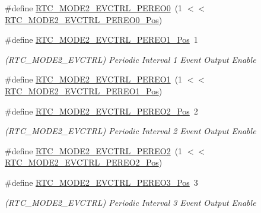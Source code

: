 \begin{DoxyCompactItemize}
\#define \mbox{\hyperlink{group___s_a_m_d21___r_t_c_ga372263f208d699c0012089888a02ea46}{R\+T\+C\+\_\+\+M\+O\+D\+E2\+\_\+\+E\+V\+C\+T\+R\+L\+\_\+\+P\+E\+R\+E\+O0}}~(1 $<$$<$ \mbox{\hyperlink{group___s_a_m_d21___r_t_c_gabcb181112a56aeecec631b74abedeb3d}{R\+T\+C\+\_\+\+M\+O\+D\+E2\+\_\+\+E\+V\+C\+T\+R\+L\+\_\+\+P\+E\+R\+E\+O0\+\_\+\+Pos}})
\item 
\#define \mbox{\hyperlink{group___s_a_m_d21___r_t_c_ga0e79167c14a87222de493856568bd6fe}{R\+T\+C\+\_\+\+M\+O\+D\+E2\+\_\+\+E\+V\+C\+T\+R\+L\+\_\+\+P\+E\+R\+E\+O1\+\_\+\+Pos}}~1
\begin{DoxyCompactList}\small\item\em (R\+T\+C\+\_\+\+M\+O\+D\+E2\+\_\+\+E\+V\+C\+T\+RL) Periodic Interval 1 Event Output Enable \end{DoxyCompactList}\item 
\#define \mbox{\hyperlink{group___s_a_m_d21___r_t_c_ga8afbad0c26e616db244521bc8642c640}{R\+T\+C\+\_\+\+M\+O\+D\+E2\+\_\+\+E\+V\+C\+T\+R\+L\+\_\+\+P\+E\+R\+E\+O1}}~(1 $<$$<$ \mbox{\hyperlink{group___s_a_m_d21___r_t_c_ga0e79167c14a87222de493856568bd6fe}{R\+T\+C\+\_\+\+M\+O\+D\+E2\+\_\+\+E\+V\+C\+T\+R\+L\+\_\+\+P\+E\+R\+E\+O1\+\_\+\+Pos}})
\item 
\#define \mbox{\hyperlink{group___s_a_m_d21___r_t_c_gae1804578e8194a9e5efe359be113f916}{R\+T\+C\+\_\+\+M\+O\+D\+E2\+\_\+\+E\+V\+C\+T\+R\+L\+\_\+\+P\+E\+R\+E\+O2\+\_\+\+Pos}}~2
\begin{DoxyCompactList}\small\item\em (R\+T\+C\+\_\+\+M\+O\+D\+E2\+\_\+\+E\+V\+C\+T\+RL) Periodic Interval 2 Event Output Enable \end{DoxyCompactList}\item 
\#define \mbox{\hyperlink{group___s_a_m_d21___r_t_c_gafd99da4acd052175dc7b01f0cd977777}{R\+T\+C\+\_\+\+M\+O\+D\+E2\+\_\+\+E\+V\+C\+T\+R\+L\+\_\+\+P\+E\+R\+E\+O2}}~(1 $<$$<$ \mbox{\hyperlink{group___s_a_m_d21___r_t_c_gae1804578e8194a9e5efe359be113f916}{R\+T\+C\+\_\+\+M\+O\+D\+E2\+\_\+\+E\+V\+C\+T\+R\+L\+\_\+\+P\+E\+R\+E\+O2\+\_\+\+Pos}})
\item 
\#define \mbox{\hyperlink{group___s_a_m_d21___r_t_c_ga1063b86f61eb55b5ecb68a4b662711d5}{R\+T\+C\+\_\+\+M\+O\+D\+E2\+\_\+\+E\+V\+C\+T\+R\+L\+\_\+\+P\+E\+R\+E\+O3\+\_\+\+Pos}}~3
\begin{DoxyCompactList}\small\item\em (R\+T\+C\+\_\+\+M\+O\+D\+E2\+\_\+\+E\+V\+C\+T\+RL) Periodic Interval 3 Event Output Enable \end{DoxyCompactList}\item 
$$
\end{DoxyCompactItemize}

